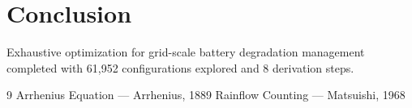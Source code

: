 \documentclass[11pt,twocolumn]{article}
\begin{document}
\section{Conclusion}
Exhaustive optimization for grid-scale battery degradation management completed with 61,952 configurations explored and 8 derivation steps.

\begin{thebibliography}{9}
 Arrhenius Equation --- Arrhenius, 1889
 Rainflow Counting --- Matsuishi, 1968
\end{thebibliography}
\end{document}

